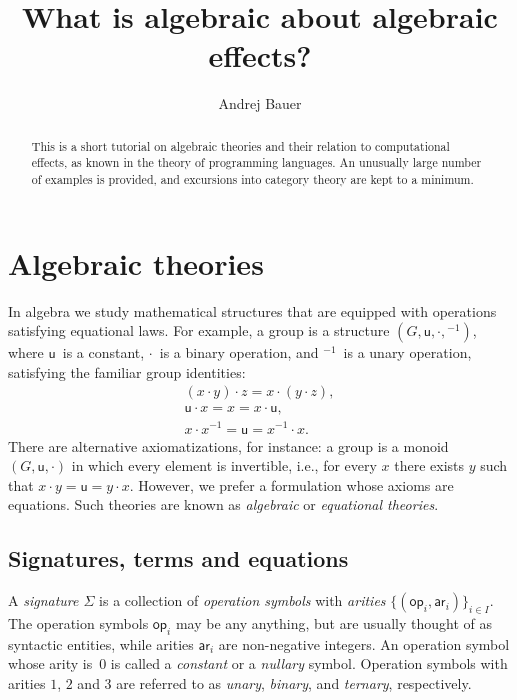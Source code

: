 \documentclass{amsart}
\newcommand{\family}[2]{\{#1\}_{#2}} %
\newcommand{\op}[1]{\mathsf{op}_{#1}} %
\newcommand{\arity}[1]{\mathsf{ar}_{#1}} %
\begin{document}
\title{What is algebraic about algebraic effects?}

\author{Andrej Bauer}

\begin{abstract}
  This is a short tutorial on algebraic theories and their relation to computational
  effects, as known in the theory of programming languages. An unusually large number of
  examples is provided, and excursions into category theory are kept to a minimum.
\end{abstract}

\maketitle

\section{Algebraic theories}
\label{sec:algebraic-theories}


In algebra we study mathematical structures that are equipped with operations satisfying
equational laws. For example, a group is a structure $(G, \mathsf{u}, {\cdot}, {}^{-1})$,
where $\mathsf{u}$~is a constant, $\cdot$~is a binary operation, and ${}^{-1}$~is a unary
operation, satisfying the familiar group identities:
%
\begin{gather*}
  (x \cdot y) \cdot z = x \cdot (y \cdot z),\\
  \mathsf{u} \cdot x = x = x \cdot \mathsf{u},\\
  x \cdot x^{-1} = \mathsf{u} = x^{-1} \cdot x.
\end{gather*}
%
There are alternative axiomatizations, for instance: a group is a monoid
$(G, \mathsf{u}, {\cdot})$ in which every element is invertible, i.e., for every $x$ there
exists $y$ such that $x \cdot y = \mathsf{u} = y \cdot x$. However, we prefer a
formulation whose axioms are equations. Such theories are known as
\emph{algebraic} or \emph{equational theories}.

\subsection{Signatures, terms and equations}
\label{sec:signatures-equations}

A \emph{signature $\Sigma$} is a collection of \emph{operation symbols} with
\emph{arities} $\family{(\op{i}, \arity{i})}{i \in I}$. The operation symbols
$\op{i}$ may be any anything, but are usually thought of as syntactic entities,
while arities $\arity{i}$ are non-negative integers. An operation symbol whose
arity is~$0$ is called a \emph{constant} or a \emph{nullary} symbol. Operation
symbols with arities $1$, $2$ and $3$ are referred to as \emph{unary},
\emph{binary}, and \emph{ternary}, respectively.
\end{document}
